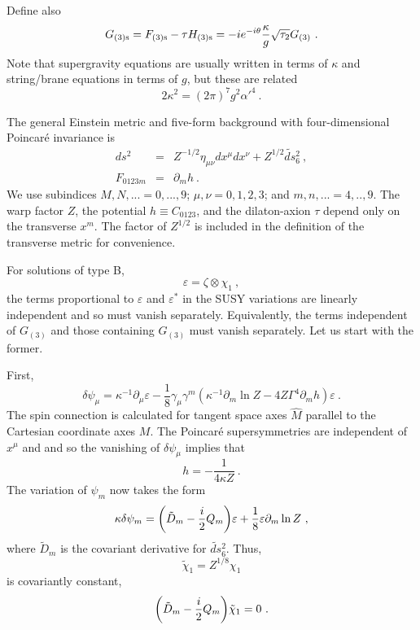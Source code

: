 \documentclass[a4paper,12pt]{article}
\renewcommand{\=}[1]{\bar{#1}}
\begin{document}
Define also
\begin{equation}
G_{(3)\rm s} = F_{(3)\rm s} - \tau H_{(3)\rm s} = -i e^{-i\theta}
\frac{\kappa}{g}
\sqrt{\tau_2} G_{(3)}\ .
\label{G3s}
\end{equation}
Note that supergravity equations are usually written in terms of $\kappa$ and
string/brane equations in terms of $g$, but these are related
\begin{equation}
2\kappa^2 = (2 \pi)^7 g^2 \alpha'^4 \ .
\end{equation}


The general Einstein metric and five-form background with four-dimensional
Poincar\'e invariance is
\begin{eqnarray}
ds^{2} &=& Z^{-1/2}\eta_{\mu\nu}dx^{\mu}dx^{\nu}+ Z^{1/2}
\widetilde{ds}{}_6^2\ ,
\label{metricZ}\\
F_{0123
m} &=& \partial_m h\ .
\label{F5}
\end{eqnarray}
We use subindices $M,N,...=0,...,9$;
$\mu,\nu = 0,1,2,3$; and $m,n,...=4,..,9$.  The warp factor $Z$, the
potential $h \equiv C_{0123}$, and the dilaton-axion $\tau$ depend only on
the transverse
$x^m$. The factor of $Z^{1/2}$ is included in the definition of the
transverse metric for convenience.

For solutions of type B,
\begin{equation}
\varepsilon = \zeta \otimes \chi_1\ ,
\end{equation}
the terms proportional to $\varepsilon$ and
$\varepsilon^*$ in the SUSY variations are linearly independent and so must
vanish separately. Equivalently, the terms independent of $G_{(3)}$ and
those containing
$G_{(3)}$ must vanish separately.  Let us start with the former.

First,
\begin{equation}
\delta \psi_\mu = \kappa^{-1} \partial_\mu \varepsilon -
\frac{1}{8}
\gamma_\mu \gamma^m (\kappa^{-1} \partial_m \ln Z - 4Z \Gamma^4 \partial_m h)
\varepsilon
\ . \label{dpmu}
\end{equation}
The spin connection is calculated for tangent space axes $\hat M$
parallel to the Cartesian coordinate axes $M$.
The Poincar\'e supersymmetries are independent of $x^\mu$ and
and so the vanishing of $\delta \psi_\mu$ implies that
\begin{equation}
h = -\frac{1}{4 \kappa Z}\ .
\end{equation}
The variation of $\psi_m$ now takes the form
\begin{equation}
\kappa \delta \psi_m = \biggl(\tilde D_{m} -{i\over2} Q_m \biggr) \varepsilon
+ \frac{1}{8}\varepsilon
\partial_m \ln Z \ , \label{dpm}
\end{equation}
where $\tilde D_m$ is the covariant derivative for $\widetilde{ds}{}_6^2$.
Thus,
\begin{equation}
\tilde \chi_1 = Z^{1/8} \chi_1
\label{chi}
\end{equation}
is covariantly constant,
\begin{equation}
\biggl(\tilde D_{m} -{i\over2} Q_m \biggr) \tilde\chi_1 = 0 \ . \label{cocon}
\end{equation}
\end{document}
